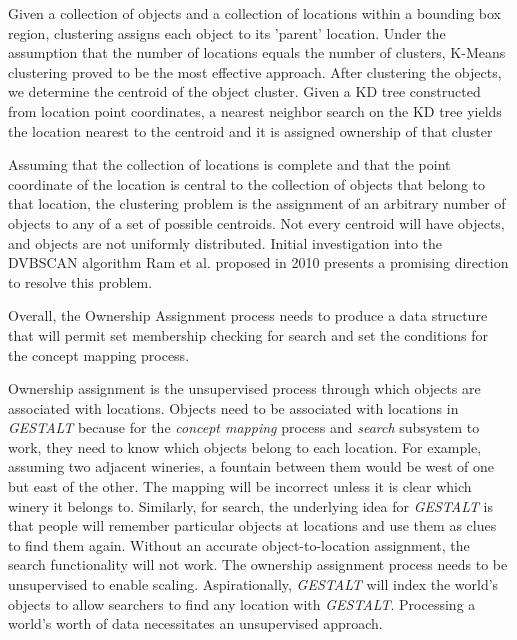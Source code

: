 Given a collection of objects and a collection of locations within a bounding box region, clustering assigns each object to its 'parent' location. 
Under the assumption that the number of locations equals the number of clusters, K-Means clustering proved to be the most effective approach. 
After clustering the objects, we determine the centroid of the object cluster. Given a KD tree constructed from location point coordinates, a nearest neighbor search on the KD tree yields the location nearest to the centroid and it is assigned ownership of that cluster

Assuming that the collection of locations is complete and that the point coordinate of the location is central to the collection of objects that belong to that location, the clustering problem is the assignment of an arbitrary number of objects to any of a set of possible centroids. Not every centroid will have objects, and objects are not uniformly distributed. Initial investigation into the DVBSCAN algorithm Ram et al. proposed in 2010 presents a promising direction to resolve this problem.\cite{Ram2010} 

Overall, the Ownership Assignment process needs to produce a data structure that will permit set membership checking for search and set the conditions for the concept mapping process. 



Ownership assignment is the unsupervised process through which objects are associated with locations. 
Objects need to be associated with locations in \textit{GESTALT} because for the \textit{concept mapping} process and \textit{search} subsystem to work, they need to know which objects belong to each location.
For example, assuming two adjacent wineries, a fountain between them would be west of one but east of the other. The mapping will be incorrect unless it is clear which winery it belongs to. 
Similarly, for search, the underlying idea for \textit{GESTALT} is that people will remember particular objects at locations and use them as clues to find them again. Without an accurate object-to-location assignment, the search functionality will not work. 
The ownership assignment process needs to be unsupervised to enable scaling. Aspirationally, \textit{GESTALT} will index the world's objects to allow searchers to find any location with \textit{GESTALT}. Processing a world's worth of data necessitates an unsupervised approach. 

